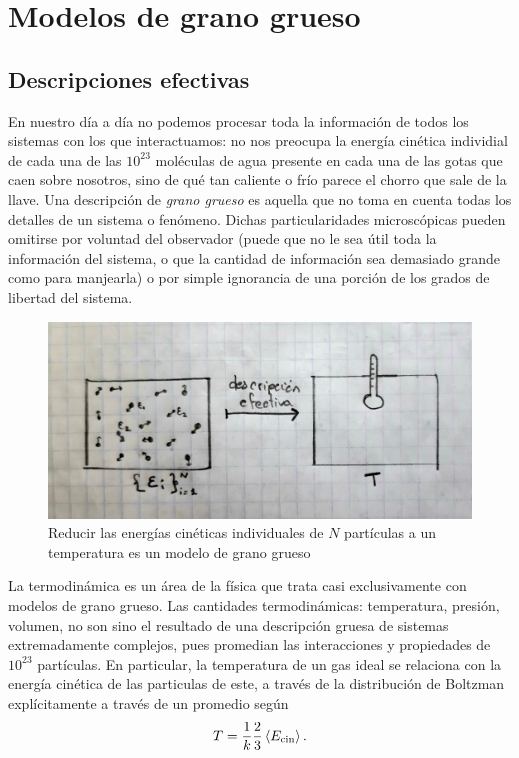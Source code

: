 \section{Modelos de grano grueso}\label{sec:Ch1CG}

\subsection{Descripciones efectivas}

En nuestro día a día no podemos procesar toda la información de todos los sistemas con los que interactuamos: no nos preocupa la energía cinética individial de cada una de las $10^{23}$ moléculas de agua presente en cada una de las gotas que caen sobre nosotros, sino de qué tan caliente o frío parece el chorro que sale de la llave. Una descripción de \textit{grano grueso} es aquella que no toma en cuenta todas los detalles de un sistema o fenómeno. Dichas particularidades microscópicas pueden omitirse por voluntad del observador (puede que no le sea útil toda la información del sistema, o que la cantidad de información sea demasiado grande como para manjearla) o por simple ignorancia de una porción de los grados de libertad del sistema.

\begin{figure}[ht]
    \centering
    \includegraphics[width=0.6\linewidth]{chapter1/figures/KtoT.jpg}
    \caption{Reducir las energías cinéticas individuales de $N$ partículas a un temperatura es un modelo de grano grueso}
    \label{fig:KtoT}
\end{figure}


La termodinámica es un área de la física que trata casi exclusivamente con modelos de grano grueso. Las cantidades termodinámicas: temperatura, presión, volumen, no son sino el resultado de una descripción gruesa de sistemas extremadamente complejos, pues promedian las interacciones y propiedades de $10^{23}$ partículas. En particular, la temperatura de un gas ideal se relaciona con la energía cinética de las particulas de este, a través de la distribución de Boltzman explícitamente a través de un promedio según
\begin{equation}
    T=\frac{1}{k}\frac{2}{3}\expval{E_{\text{cin}}}.
\end{equation}

